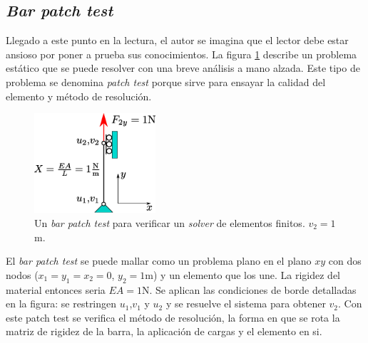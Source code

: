 \documentclass[11pt, a4paper,titlepage]{article}
\begin{document}
\subsection*{\textit{Bar patch test}}
Llegado a este punto en la lectura, el autor se imagina que el lector debe estar ansioso por poner a prueba sus conocimientos. La figura \ref{fig:barpatch} describe un problema estático que se puede resolver con una breve análisis a mano alzada. Este tipo de problema se denomina \textit{patch test} porque sirve para ensayar la calidad del elemento y método de resolución. 
\begin{figure}[htb!]
	\centering
	\includegraphics[width=0.4\textwidth]{fig/barpatch.eps}
	\caption{Un \textit{bar patch test} para verificar un \textit{solver} de elementos finitos. $v_2=1$m.}
	\label{fig:barpatch}
\end{figure}

El \textit{bar patch test} se puede mallar como un problema plano en el plano $xy$ con dos nodos ($x_1=y_1=x_2=0$, $y_2=1$m) y un elemento que los une. La rigidez del material entonces seria $EA=1$N. Se aplican las condiciones de borde detalladas en la figura: se restringen $u_1$,$v_1$ y $u_2$ y se resuelve el sistema para obtener $v_2$. Con este patch test se verifica el método de resolución, la forma en que se rota la matriz de rigidez de la barra, la aplicación de cargas y el elemento en si.
\end{document}
